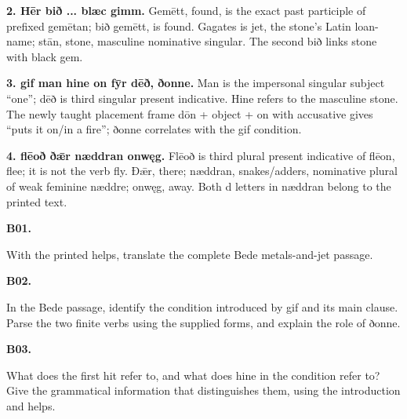 \textbf{2. Hēr bið ... blæc gimm.} Gemētt, found, is the exact past participle of prefixed gemētan; bið gemētt, is found. Gagates is jet, the stone’s Latin loan-name; stān, stone, masculine nominative singular. The second bið links stone with black gem.

\textbf{3. gif man hine on fȳr dēð, ðonne.} Man is the impersonal singular subject “one”; dēð is third singular present indicative. Hine refers to the masculine stone. The newly taught placement frame dōn + object + on with accusative gives “puts it on/\allowbreak{}in a fire”; ðonne correlates with the gif condition.

\textbf{4. flēoð ðǣr næddran onwęg.} Flēoð is third plural present indicative of flēon, flee; it is not the verb fly. Ðǣr, there; næddran, snakes/\allowbreak{}adders, nominative plural of weak feminine næddre; onwęg, away. Both d letters in næddran belong to the printed text.

\par\begin{minipage}{\linewidth}\raggedright
\textbf{B01.}

With the printed helps, translate the complete Bede metals-and-jet passage.

\end{minipage}\par\addvspace{4pt}

\par\begin{minipage}{\linewidth}\raggedright
\textbf{B02.}

In the Bede passage, identify the condition introduced by gif and its main clause. Parse the two finite verbs using the supplied forms, and explain the role of ðonne.

\end{minipage}\par\addvspace{4pt}

\par\begin{minipage}{\linewidth}\raggedright
\textbf{B03.}

What does the first hit refer to, and what does hine in the condition refer to? Give the grammatical information that distinguishes them, using the introduction and helps.

\end{minipage}\par\addvspace{4pt}

